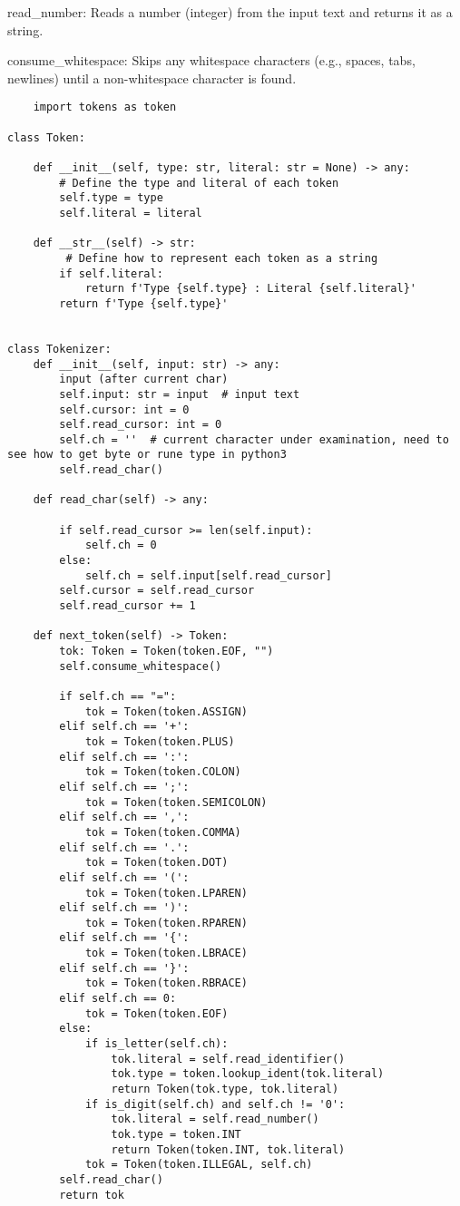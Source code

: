 read\_number: Reads a number (integer) from the input text and returns it as a string.

consume\_whitespace: Skips any whitespace characters (e.g., spaces, tabs, newlines) until a non-whitespace character is found.

\begin{lstlisting}
    import tokens as token

class Token:

    def __init__(self, type: str, literal: str = None) -> any:
        # Define the type and literal of each token
        self.type = type
        self.literal = literal

    def __str__(self) -> str:
         # Define how to represent each token as a string
        if self.literal:
            return f'Type {self.type} : Literal {self.literal}'
        return f'Type {self.type}'


class Tokenizer:
    def __init__(self, input: str) -> any:
        input (after current char)
        self.input: str = input  # input text
        self.cursor: int = 0
        self.read_cursor: int = 0
        self.ch = ''  # current character under examination, need to see how to get byte or rune type in python3
        self.read_char()

    def read_char(self) -> any:

        if self.read_cursor >= len(self.input):
            self.ch = 0
        else:
            self.ch = self.input[self.read_cursor]
        self.cursor = self.read_cursor
        self.read_cursor += 1

    def next_token(self) -> Token:
        tok: Token = Token(token.EOF, "")
        self.consume_whitespace()

        if self.ch == "=":
            tok = Token(token.ASSIGN)
        elif self.ch == '+':
            tok = Token(token.PLUS)
        elif self.ch == ':':
            tok = Token(token.COLON)
        elif self.ch == ';':
            tok = Token(token.SEMICOLON)
        elif self.ch == ',':
            tok = Token(token.COMMA)
        elif self.ch == '.':
            tok = Token(token.DOT)
        elif self.ch == '(':
            tok = Token(token.LPAREN)
        elif self.ch == ')':
            tok = Token(token.RPAREN)
        elif self.ch == '{':
            tok = Token(token.LBRACE)
        elif self.ch == '}':
            tok = Token(token.RBRACE)
        elif self.ch == 0:
            tok = Token(token.EOF)
        else:
            if is_letter(self.ch):
                tok.literal = self.read_identifier()
                tok.type = token.lookup_ident(tok.literal)
                return Token(tok.type, tok.literal)
            if is_digit(self.ch) and self.ch != '0':
                tok.literal = self.read_number()
                tok.type = token.INT
                return Token(token.INT, tok.literal)
            tok = Token(token.ILLEGAL, self.ch)
        self.read_char()
        return tok


\end{lstlisting}
